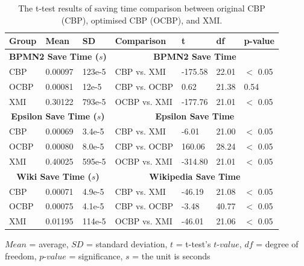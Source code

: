 \documentclass{llncs}
\begin{document}
{ \vspace{-25pt}
  \begin{table}[ht]
     \footnotesize
     \centering
     \caption{The t-test results of saving time comparison between original CBP (CBP), optimised CBP (OCBP), and XMI.}
     \label{table:ttest_results_savetime}
     \begin{tabular}
         {|p{}p{}p{}|p{}p{}p{}p{}|}
         \hline 
         
         Group & Mean & SD & Comparison & t  & df & p-value \\
         \hline 
         \multicolumn{3}{|c|}{\textbf{BPMN2 Save Time ($s$)}} & \multicolumn{4}{c|}{\textbf{BPMN2 Save Time}}\\
         CBP & 0.00097    & 123e-5 & CBP vs. XMI &  -175.58    & 22.01 & $<$ 0.05 \\  
         OCBP & 0.00081   & 12e-5 & CBP vs. OCBP & 0.62 & 21.38  & 0.54 \\  
         XMI & 0.30122   & 793e-5 & OCBP vs. XMI & -177.76    & 21.01  & $<$ 0.05 \\ 
         \hline 
         
         \multicolumn{3}{|c|}{\textbf{Epsilon Save Time ($s$)}} & \multicolumn{4}{c|}{\textbf{Epsilon Save Time}}\\
         CBP & 0.00069    & 3.4e-5 &  CBP vs. XMI & -6.01   &21.00 & $<$ 0.05 \\
         OCBP & 0.00080   & 8.0e-5 & CBP vs. OCBP & 160.06 & 28.24 & $<$ 0.05 \\  
         XMI & 0.40025   & 595e-5 & OCBP vs. XMI & -314.80  & 21.01  & $<$ 0.05 \\ 
         \hline 
         
         \multicolumn{3}{|c|}{\textbf{Wiki Save Time ($s$)}} & \multicolumn{4}{c|}{\textbf{Wikipedia Save Time}}\\
         CBP & 0.00071     & 4.9e-5 & CBP vs. XMI &  -46.19   & 21.08 & $<$ 0.05 \\ 
         OCBP &0.00075   &  4.1e-5 & CBP vs. OCBP &   -3.48 & 40.77 & $<$ 0.05 \\ 
         XMI &  0.01195   & 114e-5 & OCBP vs. XMI &  -46.01  & 21.06 & $<$ 0.05 \\ 
         \hline
     \end{tabular}
     \justify
     $Mean$ = average, $SD$ = standard deviation, $t$ = t-test's $t$-$value$, $df$ = degree of freedom, $p$-$value$ = significance, $s$ = the unit is seconds
 \end{table}
  
}
\end{document}
